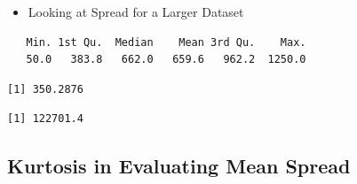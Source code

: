 \documentclass[
  letterpaper,
  DIV=11,
  numbers=noendperiod]{scrreprt}
\newenvironment{Shaded}{\begin{snugshade}}{\end{snugshade}}
\newcommand{\AttributeTok}[1]{\textcolor[rgb]{0.40,0.45,0.13}{#1}}
\newcommand{\CommentTok}[1]{\textcolor[rgb]{0.37,0.37,0.37}{#1}}
\newcommand{\ConstantTok}[1]{\textcolor[rgb]{0.56,0.35,0.01}{#1}}
\newcommand{\DocumentationTok}[1]{\textcolor[rgb]{0.37,0.37,0.37}{\textit{#1}}}
\newcommand{\FunctionTok}[1]{\textcolor[rgb]{0.28,0.35,0.67}{#1}}
\newcommand{\NormalTok}[1]{\textcolor[rgb]{0.00,0.23,0.31}{#1}}
\newcommand{\OtherTok}[1]{\textcolor[rgb]{0.00,0.23,0.31}{#1}}
\newcommand{\SpecialCharTok}[1]{\textcolor[rgb]{0.37,0.37,0.37}{#1}}
\newcommand{\StringTok}[1]{\textcolor[rgb]{0.13,0.47,0.30}{#1}}
\providecommand{\tightlist}{%
  \setlength{\itemsep}{0pt}\setlength{\parskip}{0pt}}\usepackage{longtable,booktabs,array}
\begin{document}
\begin{itemize}
\tightlist
\item
  Looking at Spread for a Larger Dataset
\end{itemize}

\begin{Shaded}
\end{Shaded}

\begin{verbatim}
   Min. 1st Qu.  Median    Mean 3rd Qu.    Max. 
   50.0   383.8   662.0   659.6   962.2  1250.0 
\end{verbatim}

\begin{Shaded}
\end{Shaded}

\begin{verbatim}
[1] 350.2876
\end{verbatim}

\begin{Shaded}
\end{Shaded}

\begin{verbatim}
[1] 122701.4
\end{verbatim}

\subsection{Kurtosis in Evaluating Mean
Spread}\label{kurtosis-in-evaluating-mean-spread}
\end{document}
